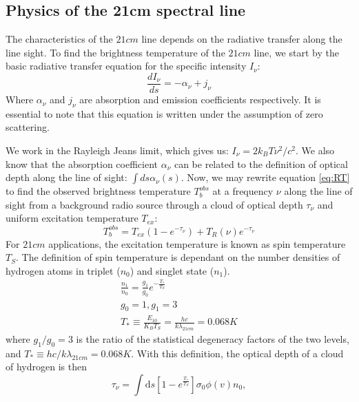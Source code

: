 \documentclass[12pt, TexShade, letterpaper]{report}
\begin{document}
\subsection{Physics of the 21cm spectral line}
The characteristics of the $21cm$ line depends on the radiative transfer along the line sight. To find the brightness temperature of the $21cm$ line, we start by the basic radiative transfer equation for the specific intensity $I_{\nu}$:
\begin{equation}
    \frac{dI_\nu}{ds} = - \alpha_\nu + j_\nu
    \label{eq:RT}
\end{equation}
Where $\alpha_\nu$ and $j_\nu$ are absorption and emission coefficients respectively. It is essential to note that this equation is written under the assumption of zero scattering. \par
We work in the Rayleigh Jeans limit, which gives us: $I_\nu = 2k_B T \nu^2 /c^2$. We also know that the absorption coefficient $\alpha_\nu$ can be related to the definition of optical depth along the line of sight: $\int ds \alpha_\nu \left(s\right)$. Now, we may rewrite equation \ref{eq:RT} to find the observed brightness temperature $T^{obs}_b$ at a frequency $\nu$ along the line of sight from a background radio source through a cloud of optical depth $\tau_\nu$ and uniform excitation temperature $T_{ex}$:
\begin{equation}
    T^{obs}_b = T_{ex} \left(1-e^{-\tau_\nu} \right) + T_R \left (\nu \right) e ^{-\tau_\nu}
\end{equation}
For $21cm$ applications, the excitation temperature is known as spin temperature $T_S$. The definition of spin temperature is dependant on the number densities of hydrogen atoms in triplet ($n_0$) and singlet state ($n_1$).
\begin{gather}
    \frac{n_1}{n_0} = \frac{g_1}{g_0} e ^ {-\frac{T_*}{T_S}}\\
    g_0 =1, g_1 =3\\
     T_* \equiv \frac{E_{10}}{K_B T_S} = \frac {hc}{k\lambda_{21cm}} = 0.068 K
\end{gather}
where $g_1/g_0 = 3$ is the ratio of the statistical degeneracy factors of the two levels, and $T_* \equiv hc/k\lambda_{21cm} = 0.068 K$. With this definition, the optical depth of a cloud of hydrogen is then 
\begin{equation}
    \tau_\nu=\int \mathrm{d} s\left[1- e^{ \frac {T_*}{ T_S}}\right] \sigma_0 \phi(v) n_0,
\end{equation}
\end{document}
